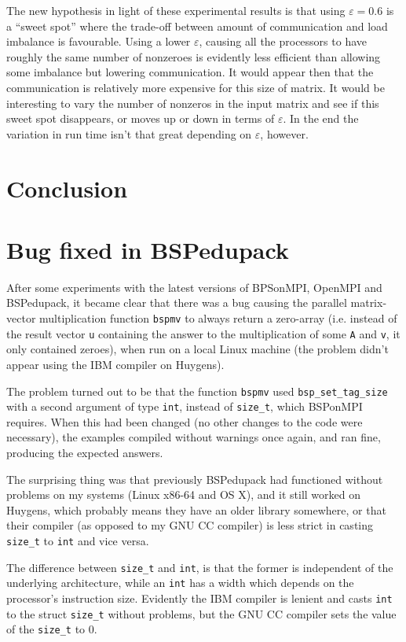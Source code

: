 \documentclass[a4paper]{article}
\begin{document}
The new hypothesis in light of these experimental results is that using $\varepsilon=0.6$ is a ``sweet spot''
where the trade-off between amount of communication and load imbalance is favourable. Using a lower $\varepsilon$,
causing all the processors to have roughly the same number of nonzeroes is evidently less efficient than allowing some
imbalance but lowering communication. It would appear then that the
communication is relatively more expensive for this size of matrix. It would be
interesting to vary the number of nonzeros in the input matrix and see if this
sweet spot disappears, or moves up or down in terms of $\varepsilon$. In the
end the variation in run time isn't that great depending on $\varepsilon$,
however.


\section{Conclusion}


\appendix
\clearpage
\section{Bug fixed in BSPedupack}

After some experiments with the latest versions of BPSonMPI, OpenMPI and
BSPedupack, it became clear that there was a bug causing the parallel matrix-vector
multiplication function
\texttt{bspmv} to always return a zero-array (i.e. instead of the result vector
\texttt{u} containing the answer to the multiplication of some \texttt{A} and
\texttt{v}, it only contained zeroes), when run on a local Linux machine (the
problem didn't appear using the IBM compiler on Huygens).

The problem turned out to be that the function \texttt{bspmv} used
\texttt{bsp\_set\_tag\_size} with a second argument of type \texttt{int},
instead of \texttt{size\_t}, which BSPonMPI requires. When this had been
changed (no other changes to the code were necessary), the examples compiled
without warnings once again, and ran fine, producing the expected answers.

The surprising thing was that previously BSPedupack had functioned without
problems on my systems (Linux x86-64 and OS X), and it still worked on Huygens,
which probably means they have an older library somewhere, or that their
compiler (as opposed to my GNU CC compiler) is less strict in casting \texttt{size\_t} to \texttt{int} and vice versa.

The difference between \texttt{size\_t} and \texttt{int}, is that the former is
independent of the underlying architecture, while an \texttt{int} has a width
which depends on the processor's instruction size. Evidently the IBM compiler
is lenient and casts \texttt{int} to the struct \texttt{size\_t} without
problems, but the GNU CC compiler sets the value of the \texttt{size\_t} to 0.
\end{document}
